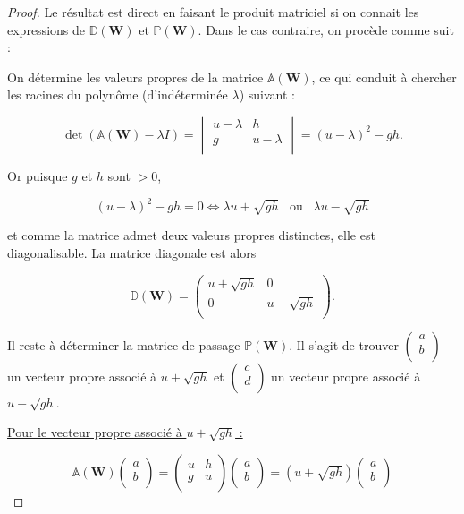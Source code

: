 \documentclass[
11pt, %
francais, %
singlespacing, %
headsepline, %
]{MastersDoctoralThesis} %
\theoremstyle{definition}
\begin{document}
\begin{proof} Le résultat est direct en faisant le produit matriciel si on connait les expressions de $\mathbb{D}(\textbf{W})$ et $\mathbb{P}(\textbf{W})$. Dans le cas contraire, on procède comme suit :


On détermine les valeurs propres de la matrice $\mathbb{A}(\textbf{W})$, ce qui conduit à chercher les racines du polynôme (d'indéterminée $\lambda$) suivant :

$$\det(\mathbb{A}(\textbf{W})-\lambda I) =\begin{vmatrix}
   u-\lambda & h  \\
   g & u-\lambda  \\
\end{vmatrix} = (u-\lambda)^{2}-gh.$$

Or puisque $g$ et $h$ sont $>0$,

$$(u-\lambda)^{2}-gh=0 \Leftrightarrow \lambda u +\sqrt{gh} \phantom{...}\text{ou}\phantom{...} \lambda u -\sqrt{gh}$$

et comme la matrice admet deux valeurs propres distinctes, elle est diagonalisable. La matrice diagonale est alors

$$\mathbb{D}(\textbf{W}) =\begin{pmatrix}
   u+\sqrt{gh} & 0  \\
   0 & u-\sqrt{gh}  \\
\end{pmatrix}.
$$

Il reste à déterminer la matrice de passage $\mathbb{P}(\textbf{W})$. Il s'agit de trouver 
$\begin{pmatrix}
   a\\
   b\\
\end{pmatrix}
$ un vecteur propre associé à $u +\sqrt{gh}$ et
$\begin{pmatrix}
   c\\
   d\\
\end{pmatrix}
$ un vecteur propre associé à $u -\sqrt{gh}$.

\underline{Pour le vecteur propre associé à $u +\sqrt{gh}$ :}


$$\mathbb{A}(\textbf{W}) \begin{pmatrix}
   a\\
   b\\
\end{pmatrix}=\begin{pmatrix}
   u & h  \\
   g & u  \\
\end{pmatrix} \begin{pmatrix}
   a\\
   b\\
\end{pmatrix}=(u+\sqrt{gh})\begin{pmatrix}
   a\\
   b\\
\end{pmatrix}$$



\end{proof}
\end{document}
